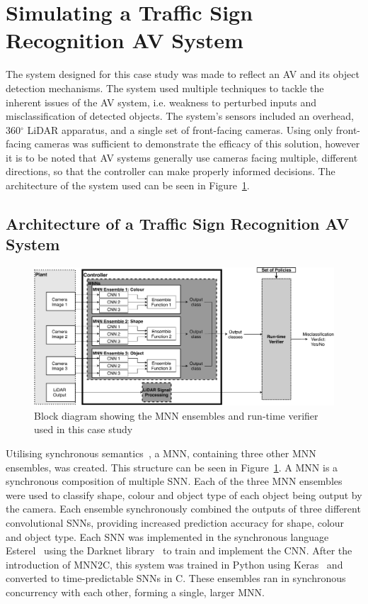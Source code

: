 \section{Simulating a Traffic Sign Recognition AV System}
The system designed for this case study was made to reflect an \acf{AV} and its object detection mechanisms. 
The system used multiple techniques to tackle the inherent issues of the \ac{AV} system, i.e. weakness to perturbed inputs and misclassification of detected objects.
The system's sensors included an overhead, 360$^\circ$ \acf{LiDAR} apparatus, and a single set of front-facing cameras.
Using only front-facing cameras was sufficient to demonstrate the efficacy of this solution, however it is to be noted that \ac{AV} systems generally use cameras facing multiple, different directions, so that the controller can make properly informed decisions.
The architecture of the system used can be seen in Figure~\ref{fig:mnn}. 

\subsection{Architecture of a Traffic Sign Recognition AV System}
\begin{figure}[h]
	\centering
	\includegraphics[width=\textwidth]{Content/fig/MNN.pdf}
	\caption{Block diagram showing the \acf{MNN} ensembles and run-time verifier used in this case study} \label{fig:mnn}
\end{figure}

Utilising synchronous semantics~\cite{benveniste2003synchronous}, a \acf{MNN}, containing three other \ac{MNN} ensembles, was created.
This structure can be seen in Figure~\ref{fig:mnn}.
A \ac{MNN} is a synchronous composition of multiple \acf{SNN}.
Each of the three \ac{MNN} ensembles were used to classify shape, colour and object type of each object being output by the camera.
Each ensemble synchronously combined the outputs of three different convolutional \acp{SNN}, providing increased prediction accuracy for shape, colour and object type. 
Each \ac{SNN} was implemented in the synchronous language Esterel~\cite{Esterel} using the Darknet library~\cite{darknet13} to train and implement the \ac{CNN}.
After the introduction of \acf{MNN2C}, this system was trained in Python using Keras~\cite{chollet2015keras} and converted to time-predictable \acp{SNN} in C.
These ensembles ran in synchronous concurrency with each other, forming a single, larger \ac{MNN}. 

